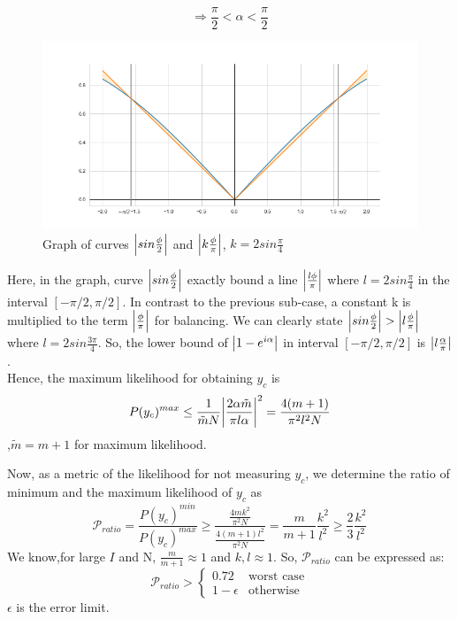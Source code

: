 $$\Rightarrow \frac{\pi}{2}< \alpha <  \frac{\pi}{2}$$
\begin{figure}[H]
    \centering
     \includegraphics[scale=0.4]{figures/sinx__2_less_than_l_x__pi.png}
    \caption{Graph of curves $\abs{sin\frac{\phi}{2} }$ and $\abs{k\frac{\phi}{\pi}} $, $k= 2 sin\frac{\pi}{4}$}
    \label{fig: sinx__2_less_than_l_x__pi}
\end{figure}
Here, in the graph, curve $\abs{sin\frac{\phi}{2} }$ exactly bound a line $\abs{\frac{l\phi}{\pi}}$ where $l= 2 sin\frac{\pi}{4}$  in the interval $[-\pi/2,\pi/2]$. In contrast to the previous sub-case, a constant k is multiplied to the term $\abs{\frac{\phi}{\pi}}$ for balancing. We can clearly state $\abs{sin\frac{\phi}{2}} > \abs{l\frac{\phi}{\pi}}$ where $l= 2 sin\frac{3\pi}{4}$. So, the lower bound of $\abs{1-e^{i\alpha}}$ in interval $[-\pi/2, \pi/2]$ is $\abs{l\frac{\alpha}{\pi}}$.
\\Hence, the maximum likelihood for obtaining $y_c$ is 
$$P(y_c)^{max} \leq \frac{1}{\tilde{m}N}\abs{\frac{2\alpha \tilde{m} }{\pi l\alpha}}^2 =\frac{4(m+1)}{\pi^2 l^2 N}$$,$\tilde{m}=m+1$ for maximum likelihood.

Now, as a metric of the likelihood for not measuring $y_c$, we determine the ratio of minimum and the maximum likelihood of $y_c$ as
\begin{equation}
   \mathcal{P}_{ratio} = \frac{P(y_c)^{min}}{P(y_c)^{max}} \geq \frac{\frac{4m k^2}{ \pi^2 N}}{\frac{4(m+1)l^2}{\pi^2  N}} = \frac{m}{m+1}\frac{k^2}{l^2} \geq \frac{2}{3}\frac{k^2}{l^2} 
\end{equation}
We know,for large $I$ and N, $\frac{m}{m+1} \approx 1$ and  $k,l \approx 1$. So, $\mathcal{P}_{ratio}$ can be expressed as:
\begin{equation*}
    \mathcal{P}_{ratio} >
    \begin{cases}
        0.72 &\text{worst case}\\
        1-\epsilon &\text{otherwise}
    \end{cases}
\end{equation*}
$\epsilon$ is the error limit.
